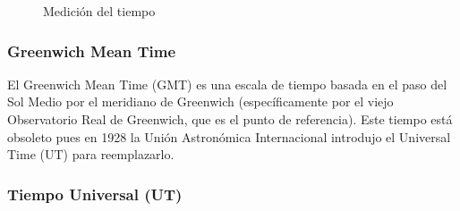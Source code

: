\begin{figure}[!h]

  \caption{Medici\'on del tiempo}
\end{figure}

\subsubsection{ Greenwich Mean Time}
\label{sec:greenwich.mean.time}

El  Greenwich Mean Time (GMT)  es una escala de tiempo basada en el paso
del Sol Medio por el meridiano de Greenwich (espec\'ificamente por el viejo
Observatorio Real de Greenwich, que es el punto de referencia).
Este tiempo est\'a  obsoleto pues en 1928 la Uni\'on Astron\'omica 
 Internacional introdujo el  Universal Time (UT) para reemplazarlo.

\subsubsection{Tiempo Universal (UT)}
\label{sec:tiempo.universal}


